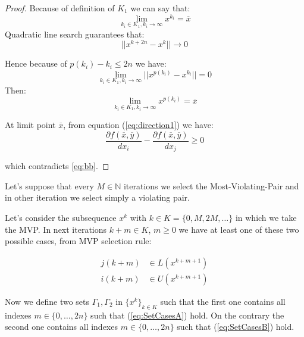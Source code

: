 \begin{proof}
Because of  definition of $K_1$ we can say that:
\begin{equation}
 \lim_{k_i \in K_1, k_i \rightarrow \infty} x^{k_i} =\overline{x}
\end{equation}
Quadratic line search guarantees that:
\begin{equation}
 ||x^{k+2n}-x^{k}|| \rightarrow 0
\end{equation}

Hence because of $p(k_i)-k_i \le 2n$ we have:
\begin{equation}
 \lim_{k_i \in K_1,k_i\rightarrow \infty}  ||x^{p(k_i)}-x^{k_i}||=0
\end{equation}
Then:
\begin{equation}
 \lim_{k_i \in K_1,k_i\rightarrow \infty} x^{p(k_i)}=\overline{x}
\end{equation}

At limit point $\overline{x}$, from equation (\ref{eq:direction1})  we have: 
\begin{equation*}
 \frac{\partial f(\overline{x},\overline{y})}{dx_i} - \frac{\partial f(\overline{x},\overline{y})}{dx_{j}} \ge 0
\end{equation*}

which contradicts \ref{eq:bb}.
\end{proof}
\fi
 Let's suppose that every $M \in \mathbb{N}$ iterations we select the Most-Violating-Pair and in other iteration we select simply a violating pair.
 
 Let's consider the subsequence $x^{k}$ with $k  \in K =\{0,M,2M,\ldots\}$ in which we take the MVP.
 In next iterations $k+m \in K$, $m\ge 0$ we have at least one of these two possible cases, from MVP selection rule:

 
 \begin{subequations}
\begin{align}
 j(k+m) &\in L(x^{k+m+1})\label{eq:SetCasesA}\\
 i(k+m) &\in U(x^{k+m+1})\label{eq:SetCasesB}
\end{align}
\end{subequations}
 
 
 
Now we define two sets $\Gamma_1,\Gamma_2$ in $\{x^{k}\}_{k \in K}$ such that the first one contains all indexes $m \in\{0,\ldots,2n\}$ such that (\ref{eq:SetCasesA}) hold.
On the contrary the second one contains all indexes $m \in\{0,\ldots,2n\}$ such that (\ref{eq:SetCasesB}) hold.

